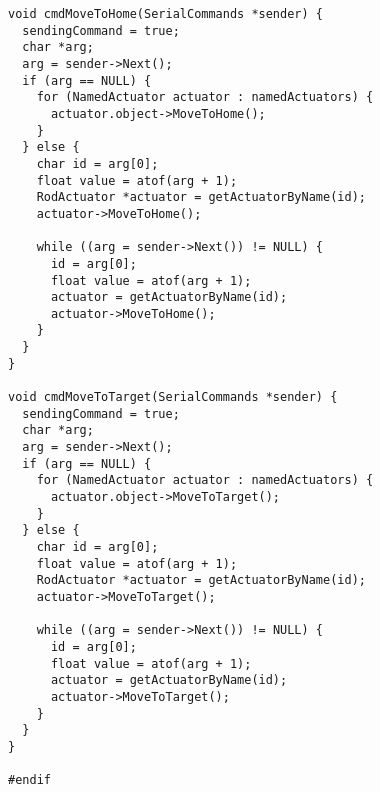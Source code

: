 \begin{verbatim}
void cmdMoveToHome(SerialCommands *sender) {
  sendingCommand = true;
  char *arg;
  arg = sender->Next();
  if (arg == NULL) {
    for (NamedActuator actuator : namedActuators) {
      actuator.object->MoveToHome();
    }
  } else {
    char id = arg[0];
    float value = atof(arg + 1);
    RodActuator *actuator = getActuatorByName(id);
    actuator->MoveToHome();

    while ((arg = sender->Next()) != NULL) {
      id = arg[0];
      float value = atof(arg + 1);
      actuator = getActuatorByName(id);
      actuator->MoveToHome();
    }
  }
}

void cmdMoveToTarget(SerialCommands *sender) {
  sendingCommand = true;
  char *arg;
  arg = sender->Next();
  if (arg == NULL) {
    for (NamedActuator actuator : namedActuators) {
      actuator.object->MoveToTarget();
    }
  } else {
    char id = arg[0];
    float value = atof(arg + 1);
    RodActuator *actuator = getActuatorByName(id);
    actuator->MoveToTarget();

    while ((arg = sender->Next()) != NULL) {
      id = arg[0];
      float value = atof(arg + 1);
      actuator = getActuatorByName(id);
      actuator->MoveToTarget();
    }
  }
}

#endif
\end{verbatim}

